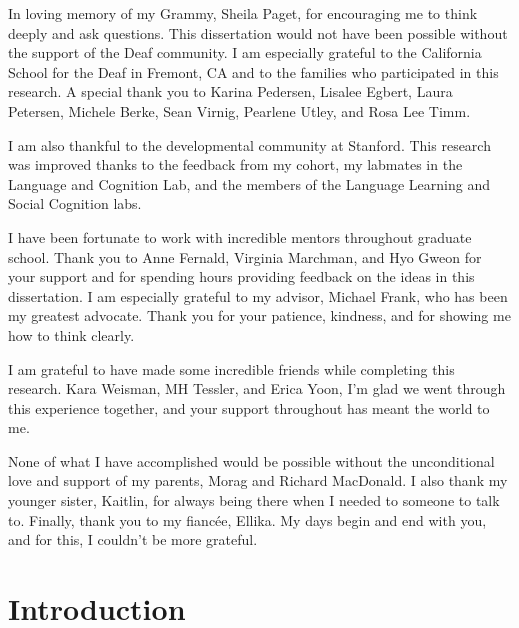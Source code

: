 \documentclass[oneside]{report}
\begin{document}
In loving memory of my Grammy, Sheila Paget, for encouraging me to think
deeply and ask questions.
This dissertation would not have been possible without the support of
the Deaf community. I am especially grateful to the California School
for the Deaf in Fremont, CA and to the families who participated in this
research. A special thank you to Karina Pedersen, Lisalee Egbert, Laura
Petersen, Michele Berke, Sean Virnig, Pearlene Utley, and Rosa Lee Timm.

I am also thankful to the developmental community at Stanford. This
research was improved thanks to the feedback from my cohort, my labmates
in the Language and Cognition Lab, and the members of the Language
Learning and Social Cognition labs.

I have been fortunate to work with incredible mentors throughout
graduate school. Thank you to Anne Fernald, Virginia Marchman, and Hyo
Gweon for your support and for spending hours providing feedback on the
ideas in this dissertation. I am especially grateful to my advisor,
Michael Frank, who has been my greatest advocate. Thank you for your
patience, kindness, and for showing me how to think clearly.

I am grateful to have made some incredible friends while completing this
research. Kara Weisman, MH Tessler, and Erica Yoon, I'm glad we went
through this experience together, and your support throughout has meant
the world to me.

None of what I have accomplished would be possible without the
unconditional love and support of my parents, Morag and Richard
MacDonald. I also thank my younger sister, Kaitlin, for always being
there when I needed to someone to talk to. Finally, thank you to my
fiancée, Ellika. My days begin and end with you, and for this, I
couldn't be more grateful.

\afterpreface


\chapter*{Introduction}\label{intro}
\end{document}
